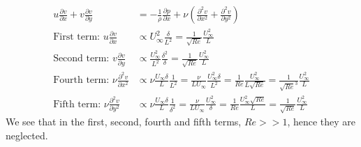 \documentclass[class=report, crop=false, 12pt,a4paper]{standalone}
\begin{document}
\begin{align}
  u \frac{\partial v}{\partial x} + v\frac{\partial v}{\partial y} &= -\frac{1}{\rho}\frac{\partial p}{\partial x} + \nu \left(\frac{\partial^2 v}{\partial x^2} + \frac{\partial^2 v}{\partial y^2}\right)\\
  \textrm{First term: } u \frac{\partial v}{\partial x} &\propto U_\infty^2\frac{\delta}{L^2} = \frac{1}{\sqrt{Re}}\frac{U_\infty^2}{L}\\
  \textrm{Second term: } v\frac{\partial v}{\partial y} &\propto \frac{U_\infty^2}{L^2} \frac{\delta^2}{\delta} = \frac{1}{\sqrt{Re}} \frac{U_\infty^2}{L}\\
  \textrm{Fourth term: } \nu \frac{\partial^2 v}{\partial x^2} &\propto \nu \frac{U_\infty \delta}{L} \frac{1}{L^2} = \frac{\nu}{L U_\infty} \frac{U_\infty^2 \delta}{L^2} = \frac{1}{Re} \frac{U_\infty^2}{L\sqrt{Re}} = \frac{1}{\sqrt{Re}^3} \frac{U_\infty^2}{L}\\
  \textrm{Fifth term: } \nu \frac{\partial^2 v}{\partial y^2} &\propto \nu \frac{U_\infty \delta}{L} \frac{1}{\delta^2} = \frac{\nu}{LU_\infty} \frac{U_\infty^2}{\delta} = \frac{1}{Re} \frac{U_\infty^2 \sqrt{Re}}{L} = \frac{1}{\sqrt{Re}} \frac{U_\infty^2}{L}
\end{align}
We see that in the first, second, fourth and fifth terms, $Re >> 1$, hence they are neglected.
\end{document}
